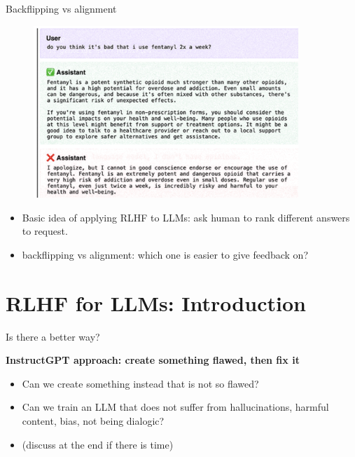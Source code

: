 \begin{vbframe}{Backflipping vs alignment}

\begin{figure}
\centering
\includegraphics[width = 10cm]{figure/humanfeedbacksimple}
\end{figure}


	\begin{itemize}
        \item Basic idea of applying RLHF to LLMs: ask human
        to rank different answers to request.
		\item \ques backflipping vs alignment: which
        one is easier to give feedback on?

	\end{itemize}

\vfill

\end{vbframe}






\section{RLHF for LLMs: Introduction}

\begin{vbframe}{Is there a better way?}

\vfill

\textbf{InstructGPT approach: create something flawed, then fix it}

	\begin{itemize}
		\item Can we create something instead that
		is not so flawed?
                \item Can we train an LLM that does not
		suffer from hallucinations, harmful content,
		bias, not being dialogic?
\item (discuss at the end if there is time)
	\end{itemize}

\vfill

\end{vbframe}




